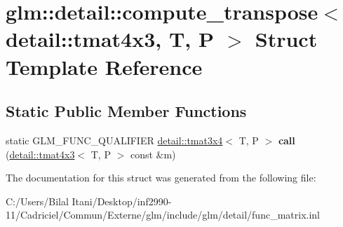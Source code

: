 \hypertarget{structglm_1_1detail_1_1compute__transpose_3_01detail_1_1tmat4x3_00_01_t_00_01_p_01_4}{}\section{glm\+:\+:detail\+:\+:compute\+\_\+transpose$<$ detail\+:\+:tmat4x3, T, P $>$ Struct Template Reference}
\label{structglm_1_1detail_1_1compute__transpose_3_01detail_1_1tmat4x3_00_01_t_00_01_p_01_4}
\subsection*{Static Public Member Functions}
\begin{DoxyCompactItemize}
\item 
static G\+L\+M\+\_\+\+F\+U\+N\+C\+\_\+\+Q\+U\+A\+L\+I\+F\+I\+ER \hyperlink{structglm_1_1detail_1_1tmat3x4}{detail\+::tmat3x4}$<$ T, P $>$ {\bfseries call} (\hyperlink{structglm_1_1detail_1_1tmat4x3}{detail\+::tmat4x3}$<$ T, P $>$ const \&m)\hypertarget{structglm_1_1detail_1_1compute__transpose_3_01detail_1_1tmat4x3_00_01_t_00_01_p_01_4_aba1245556b2c86727dfb37d64f6a9b9a}{}\label{structglm_1_1detail_1_1compute__transpose_3_01detail_1_1tmat4x3_00_01_t_00_01_p_01_4_aba1245556b2c86727dfb37d64f6a9b9a}

\end{DoxyCompactItemize}


The documentation for this struct was generated from the following file\+:\begin{DoxyCompactItemize}
\item 
C\+:/\+Users/\+Bilal Itani/\+Desktop/inf2990-\/11/\+Cadriciel/\+Commun/\+Externe/glm/include/glm/detail/func\+\_\+matrix.\+inl\end{DoxyCompactItemize}
